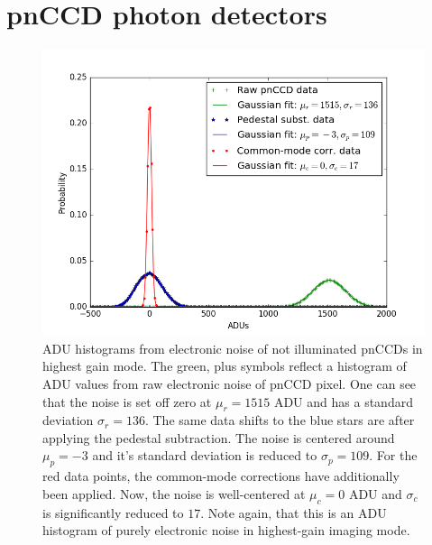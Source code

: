 \section{pnCCD photon detectors}\label{sec:pnccd-corr}
\begin{figure}
	\centering
		\includegraphics[width=1.00\textwidth]{images/pnCCD-electronic-noise.png}
	\caption[ADU histograms from electronic noise of not illuminated pnCCDs.]{ADU histograms from electronic noise of not illuminated pnCCDs in highest gain mode. The green, plus symbols reflect a histogram of ADU values from raw electronic noise of pnCCD pixel. One can see that the noise is set off zero at $\mu_{r}=1515$ ADU and has a standard deviation $\sigma_{r}=136$. The same data shifts to the blue stars are after applying the pedestal subtraction. The noise is centered around $\mu_{p}=-3$ and it's standard deviation is reduced to $\sigma_{p}=109$. For the red  data points, the common-mode corrections have additionally been applied. Now, the noise is well-centered at $\mu_{c}=0$ ADU and $\sigma_{c}$ is significantly reduced to $17$. Note again, that this is an ADU histogram of purely electronic noise in highest-gain imaging mode.}
	\label{fig:pnCCD-electronic-noise}
\end{figure}
